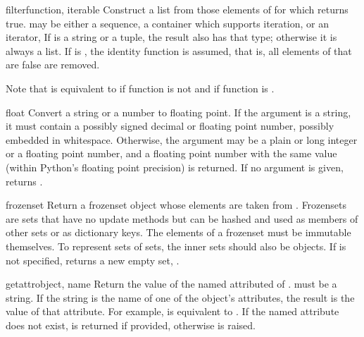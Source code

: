 \begin{funcdesc}{filter}{function, iterable}
  Construct a list from those elements of  for which
   returns true.   may be either a sequence, a
  container which supports iteration, or an iterator,  If 
  is a string or a tuple, the result
  also has that type; otherwise it is always a list.  If  is
  , the identity function is assumed, that is, all elements of
   that are false are removed.

  Note that  is equivalent to
   if function is
  not  and  if
  function is .
\end{funcdesc}

\begin{funcdesc}{float}{}
  Convert a string or a number to floating point.  If the argument is a
  string, it must contain a possibly signed decimal or floating point
  number, possibly embedded in whitespace. Otherwise, the argument may be a plain
  or long integer or a floating point number, and a floating point
  number with the same value (within Python's floating point
  precision) is returned.  If no argument is given, returns .

\end{funcdesc}

\begin{funcdesc}{frozenset}{}
  Return a frozenset object whose elements are taken from .
  Frozensets are sets that have no update methods but can be hashed and
  used as members of other sets or as dictionary keys.  The elements of
  a frozenset must be immutable themselves.  To represent sets of sets,
  the inner sets should also be  objects.  If
   is not specified, returns a new empty set,
  .
\end{funcdesc}

\begin{funcdesc}{getattr}{object, name}
  Return the value of the named attributed of .  
  must be a string.  If the string is the name of one of the object's
  attributes, the result is the value of that attribute.  For example,
   is equivalent to .  If the
  named attribute does not exist,  is returned if provided,
  otherwise  is raised.
\end{funcdesc}

